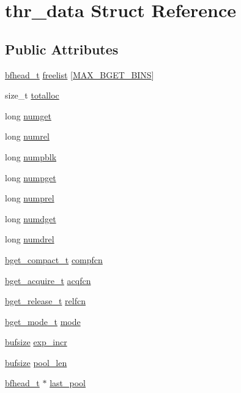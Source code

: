 \hypertarget{structthr__data}{\section{thr\-\_\-data Struct Reference}
\label{structthr__data}
}
\subsection*{Public Attributes}
\begin{DoxyCompactItemize}
\item 
\hyperlink{kmp__alloc_8c_abd11e50b08fcad0d4fbfdce33582213c}{bfhead\-\_\-t} \hyperlink{structthr__data_a1ebad8a4582b7e9d0ed15ca2f2448def}{freelist} \mbox{[}\hyperlink{kmp__alloc_8c_af312994da10c636eaa83074b49b44b0a}{M\-A\-X\-\_\-\-B\-G\-E\-T\-\_\-\-B\-I\-N\-S}\mbox{]}
\item 
size\-\_\-t \hyperlink{structthr__data_a190c144a686f291c888741d25b4f6547}{totalloc}
\item 
long \hyperlink{structthr__data_afefb9a334169efb3a1b64eee22f3e60c}{numget}
\item 
long \hyperlink{structthr__data_a391d2806f8e5595fb66a01484c860bf0}{numrel}
\item 
long \hyperlink{structthr__data_ace2317a7c31b3b8ecb3b10ea1067fee0}{numpblk}
\item 
long \hyperlink{structthr__data_a5351a12df0ac848e4148dd2466a4026d}{numpget}
\item 
long \hyperlink{structthr__data_ac9ff0cac89239d263184e77107c03b7d}{numprel}
\item 
long \hyperlink{structthr__data_a2306c5452a73e20dd817a16363162f62}{numdget}
\item 
long \hyperlink{structthr__data_a8f43a52aba5a9b92da0da539dba756c1}{numdrel}
\item 
\hyperlink{kmp__alloc_8c_a97451db29023098b5723ad1ba00f944f}{bget\-\_\-compact\-\_\-t} \hyperlink{structthr__data_ac022ffa492a079f49040bd922cd9dcf8}{compfcn}
\item 
\hyperlink{kmp__alloc_8c_a21f03e368c4e90d00ed20a2b01985ecd}{bget\-\_\-acquire\-\_\-t} \hyperlink{structthr__data_a56f7eab7df7b5d625e22cda6805f2b40}{acqfcn}
\item 
\hyperlink{kmp__alloc_8c_ad26e5d39dca5e04fbcfb74a022e2fcdb}{bget\-\_\-release\-\_\-t} \hyperlink{structthr__data_ab94c9cee76c857baf0a3a3d887b47bd1}{relfcn}
\item 
\hyperlink{kmp__alloc_8c_a625b1696056adee9c191ae4c8fc05f69}{bget\-\_\-mode\-\_\-t} \hyperlink{structthr__data_a790f977bb5c8b2b3409c1cf025c92f65}{mode}
\item 
\hyperlink{kmp__alloc_8c_acb70eb20828ff76ed9200989f7dcd043}{bufsize} \hyperlink{structthr__data_ad76a1f415abd6cbf1c4f9b2c091e3c21}{exp\-\_\-incr}
\item 
\hyperlink{kmp__alloc_8c_acb70eb20828ff76ed9200989f7dcd043}{bufsize} \hyperlink{structthr__data_a614e5671e1497475cd564343d2a1cd3f}{pool\-\_\-len}
\item 
\hyperlink{kmp__alloc_8c_abd11e50b08fcad0d4fbfdce33582213c}{bfhead\-\_\-t} $\ast$ \hyperlink{structthr__data_aac5ddbd2e9047f283da46c5ae55686fe}{last\-\_\-pool}
\end{DoxyCompactItemize}


